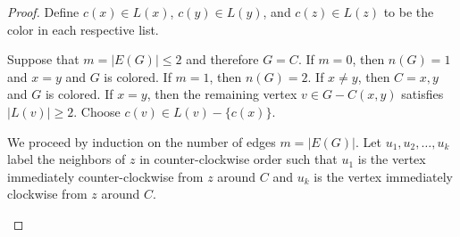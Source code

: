 \documentclass[12pt,letterpaper]{article}
\theoremstyle{plain}
\theoremstyle{definition}
\theoremstyle{break}
\begin{document}
\begin{proof}
Define $c(x)\in L(x)$, $c(y)\in L(y)$, and $c(z)\in L(z)$ to be the color in
each respective list.

Suppose that $m=|E(G)|\le 2$ and therefore $G=C$.
If $m=0$, then $n(G)=1$ and $x=y$ and $G$ is colored.
If $m=1$, then $n(G)= 2$. If $x\ne y$, then $C=x,y$ and $G$ is colored.
If $x=y$, then the remaining vertex
$v\in G-C(x,y)$ satisfies $|L(v)|\ge 2$. Choose $c(v)\in L(v)-\{c(x)\}$.

We proceed by induction on the number of edges $m=|E(G)|$. Let
$u_1,u_2,\ldots,u_k$ label the neighbors of $z$ in counter-clockwise
order such that $u_1$ is the vertex immediately counter-clockwise from $z$ around $C$
and $u_k$ is the vertex immediately clockwise from $z$ around $C$.

\begin{figure}[ht]
\begin{center}
\end{center}
\end{figure}
\end{proof}
\end{document}
